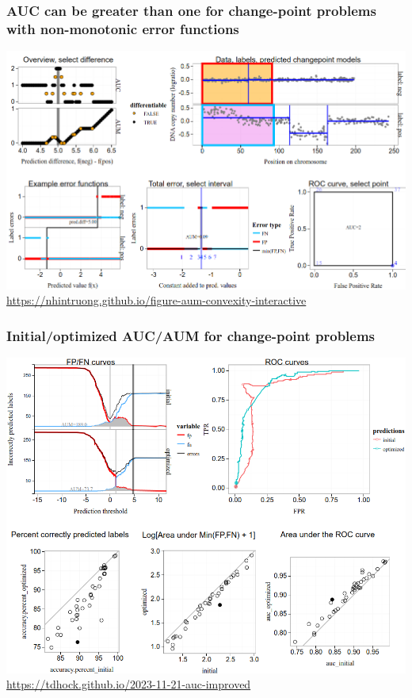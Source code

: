 \documentclass[t]{beamer}
\begin{document}
\begin{frame}
  \frametitle{AUC can be greater than one for change-point problems with non-monotonic error functions}
  \centering
  \includegraphics[height=0.7\textheight]{screenshot-auc-2-example}
  \scriptsize
  \url{https://nhintruong.github.io/figure-aum-convexity-interactive}
\end{frame}

\begin{frame}
  \frametitle{Initial/optimized AUC/AUM for change-point problems}
  \centering
  \includegraphics[height=0.7\textheight]{figure-auc-improved-interactive-screenshot}
  \url{https://tdhock.github.io/2023-11-21-auc-improved}
\end{frame}
\end{document}
